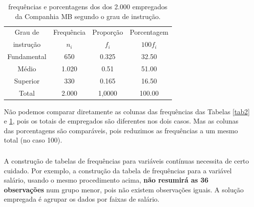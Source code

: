 \documentclass[12pt]{beamer}
\begin{document}
\begin{frame}{}
\frametitle{}
\vspace{-1cm}
\begin{block}{}
\justifying
\begin{table}[H]
\caption{frequências e porcentagens dos dos 2.000 empregados da Companhia MB segundo o grau de instrução.}
\label{tab3}
\begin{tabular}{c|c|c|c}
\hline
Grau de   &Frequência&Proporção&Porcentagem\\
instrução &$n_{i}$   &$f_{i}$  &$100f_{i}$ \\
\hline
Fundamental&650      &0.325    &32.50      \\
Médio      &1.020    &0.51     &51.00      \\
Superior   & 330     &0.165    &16.50      \\
\hline
Total      &2.000    &1,0000   &100.00     \\
\hline
\end{tabular}
\end{table}
\end{block}
\pause
\vspace{-1.2cm}
\begin{block}{}
	\justifying
Não podemos comparar diretamente as colunas das frequências das Tabelas \ref{tab2} e \ref{tab3}, pois os totais de empregados são diferentes nos dois casos. Mas 
as colunas das porcentagens são comparáveis, pois reduzimos as frequências a um mesmo total (no caso 100).
\end{block}
\end{frame}

\begin{frame}{}
\frametitle{}
\begin{block}{}
\justifying
A construção de tabelas de frequências para variáveis contínuas necessita de certo
cuidado. Por exemplo, a construção da tabela de frequências para a variável salário,
usando o mesmo procedimento acima, \textbf{não resumirá as 36 observações} num grupo
menor, pois não existem observações iguais. A solução empregada é agrupar os dados
por faixas de salário.
\end{block}
\end{frame}
\end{document}
